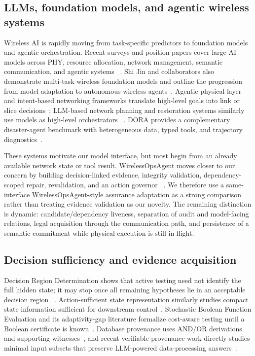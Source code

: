 \documentclass[journal,10pt]{IEEEtran}
\begin{document}
\subsection{LLMs, foundation models, and agentic wireless systems}
Wireless AI is rapidly moving from task-specific predictors to foundation models and agentic
orchestration. Recent surveys and position papers cover large AI models across PHY, resource
allocation, network management, semantic communication, and agentic systems
~\cite{jiang2026largemodelsurvey,liang2025llmwireless,lu2026agenticgnn}. Shi Jin and collaborators
also demonstrate multi-task wireless foundation models and outline the progression from model
adaptation to autonomous wireless agents~\cite{sheng2025wirelessfm,liang2025llmwireless}.
Agentic physical-layer and intent-based networking frameworks translate high-level goals into
link or slice decisions~\cite{li2026agenticwireless,jiang2026agenticibn}; LLM-based network
planning and restoration systems similarly use models as high-level orchestrators
~\cite{topollm,ossgpt}. DORA provides a complementary disaster-agent benchmark with heterogeneous
data, typed tools, and trajectory diagnostics~\cite{dora2026}.

These systems motivate our model interface, but most begin from an already available network state
or tool result. WirelessOpsAgent moves closer to our concern by building decision-linked evidence,
integrity validation, dependency-scoped repair, revalidation, and an action governor
~\cite{lu2026wirelessops}. We therefore use a same-interface WirelessOpsAgent-style assurance
adaptation as a strong comparison rather than treating evidence validation as our novelty. The
remaining distinction is dynamic: candidate/dependency liveness, separation of audit and
model-facing relations, legal acquisition through the communication path, and persistence of a
semantic commitment while physical execution is still in flight.

\subsection{Decision sufficiency and evidence acquisition}
Decision Region Determination shows that active testing need not identify the full hidden state;
it may stop once all remaining hypotheses lie in an acceptable decision region
~\cite{javdani2014drd}. Action-sufficient state representation similarly studies compact state
information sufficient for downstream control~\cite{huang2022asr}. Stochastic Boolean Function
Evaluation and its adaptivity-gap literature formalize cost-aware testing until a Boolean
certificate is known~\cite{deshpande2013sbfe,hellerstein2022adaptivity}. Database provenance uses
AND/OR derivations and supporting witnesses~\cite{green2007provenance}, and recent verifiable
provenance work directly studies minimal input subsets that preserve LLM-powered data-processing
answers~\cite{lin2026blip}.
\end{document}
